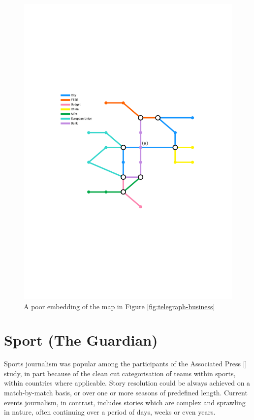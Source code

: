 \begin{figure}[htbp!]
	\centering
	\includegraphics[width=\textwidth]{img/results/telegraph-business-poor.pdf}
	\caption{A poor embedding of the map in Figure \ref{fig:telegraph-business}}
	\label{fig:telegraph-business-poor}
\end{figure}


\section{Sport (The Guardian) \label{sec:sport}}

Sports journalism was popular among the participants of the Associated Press [\citeyear{anewmodelfornews}] study, in part because of the clean cut categorisation of teams within sports, within countries where applicable. Story resolution could be always achieved on a match-by-match basis, or over one or more seasons of predefined length. Current events journalism, in contrast, includes stories which are complex and sprawling in nature, often continuing over a period of days, weeks or even years.

